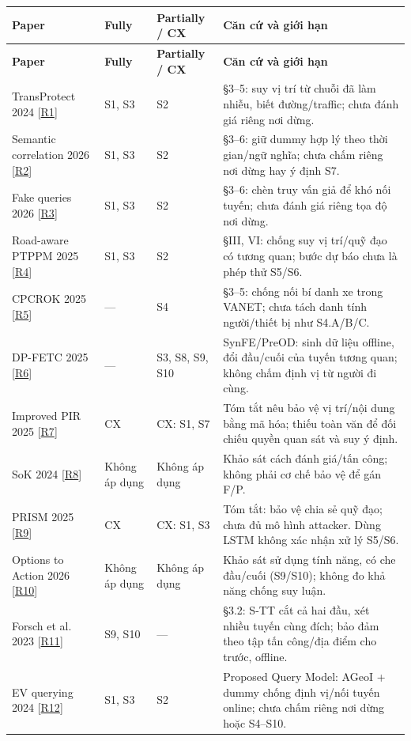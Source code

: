 \documentclass[10pt,a4paper]{article}
\begin{document}
\begingroup\small
\begin{longtable}{@{}P{3.387cm}P{1.742cm}P{2.613cm}P{8.614cm}@{}}
\toprule
\textbf{Paper} & \textbf{Fully} & \textbf{Partially / CX} & \textbf{Căn cứ và giới hạn}\\\midrule
\endfirsthead
\toprule
\textbf{Paper} & \textbf{Fully} & \textbf{Partially / CX} & \textbf{Căn cứ và giới hạn}\\\midrule
\endhead
\bottomrule\endfoot
TransProtect 2024 [\hyperlink{ref-R1}{R1}] & S1, S3 & S2 & §3–5: suy vị trí từ chuỗi đã làm nhiễu, biết đường/traffic; chưa đánh giá riêng nơi dừng.\\
\addlinespace[3pt]
Semantic correlation 2026 [\hyperlink{ref-R2}{R2}] & S1, S3 & S2 & §3–6: giữ dummy hợp lý theo thời gian/ngữ nghĩa; chưa chấm riêng nơi dừng hay ý định S7.\\
\addlinespace[3pt]
Fake queries 2026 [\hyperlink{ref-R3}{R3}] & S1, S3 & S2 & §3–6: chèn truy vấn giả để khó nối tuyến; chưa đánh giá riêng tọa độ nơi dừng.\\
\addlinespace[3pt]
Road-aware PTPPM 2025 [\hyperlink{ref-R4}{R4}] & S1, S3 & S2 & §III, VI: chống suy vị trí/quỹ đạo có tương quan; bước dự báo chưa là phép thử S5/S6.\\
\addlinespace[3pt]
CPCROK 2025 [\hyperlink{ref-R5}{R5}] & — & S4 & §3–5: chống nối bí danh xe trong VANET; chưa tách danh tính người/thiết bị như S4.A/B/C.\\
\addlinespace[3pt]
DP-FETC 2025 [\hyperlink{ref-R6}{R6}] & — & S3, S8, S9, S10 & SynFE/PreOD: sinh dữ liệu offline, đổi đầu/cuối của tuyến tương quan; không chấm định vị từ người đi cùng.\\
\addlinespace[3pt]
Improved PIR 2025 [\hyperlink{ref-R7}{R7}] & CX & CX: S1, S7 & Tóm tắt nêu bảo vệ vị trí/nội dung bằng mã hóa; thiếu toàn văn để đối chiếu quyền quan sát và suy ý định.\\
\addlinespace[3pt]
SoK 2024 [\hyperlink{ref-R8}{R8}] & Không áp dụng & Không áp dụng & Khảo sát cách đánh giá/tấn công; không phải cơ chế bảo vệ để gán F/P.\\
\addlinespace[3pt]
PRISM 2025 [\hyperlink{ref-R9}{R9}] & CX & CX: S1, S3 & Tóm tắt: bảo vệ chia sẻ quỹ đạo; chưa đủ mô hình attacker. Dùng LSTM không xác nhận xử lý S5/S6.\\
\addlinespace[3pt]
Options to Action 2026 [\hyperlink{ref-R10}{R10}] & Không áp dụng & Không áp dụng & Khảo sát sử dụng tính năng, có che đầu/cuối (S9/S10); không đo khả năng chống suy luận.\\
\addlinespace[3pt]
Forsch et al. 2023 [\hyperlink{ref-R11}{R11}] & S9, S10 & — & §3.2: S-TT cắt cả hai đầu, xét nhiều tuyến cùng đích; bảo đảm theo tập tấn công/địa điểm cho trước, offline.\\
\addlinespace[3pt]
EV querying 2024 [\hyperlink{ref-R12}{R12}] & S1, S3 & S2 & Proposed Query Model: AGeoI + dummy chống định vị/nối tuyến online; chưa chấm riêng nơi dừng hoặc S4–S10.\\
\end{longtable}
\end{document}
